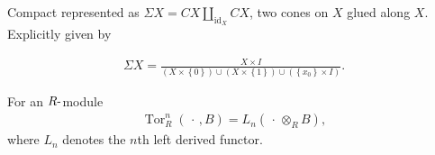
\begin{definition}

\end{definition}


\begin{definition}[Suspension]

Compact represented as
\(\Sigma X = CX \coprod_{\operatorname{id}_{X}} CX\), two cones on \(X\)
glued along \(X\). Explicitly given by

\begin{align*}\Sigma X = \frac{X\times I}{(X\times\left\{{0}\right\}) \cup(X\times\left\{{1}\right\}) \cup(\left\{{x_{0}}\right\} \times I)}
.\end{align*}

\end{definition}

\begin{definition}

For an \(R{\hbox{-}}\)module
\begin{align*}
\operatorname{Tor}_{R}^n({\,\cdot\,}, B) = L_{n}({\,\cdot\,}\otimes_{R} B)
,\end{align*}
where \(L_{n}\) denotes the \(n\)th left derived functor.

\end{definition}

\begin{definition}

\end{definition}


\begin{definition}

\end{definition}


\begin{definition}

\end{definition}


\begin{definition}

\end{definition}

